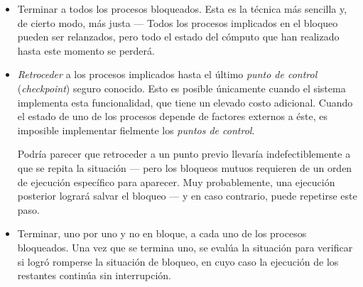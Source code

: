 \documentclass[11pt,fleqn]{book} %
\begin{document}
\begin{itemize}
\item Terminar a todos los procesos bloqueados. Esta es la técnica más
  sencilla y, de cierto modo, más justa — Todos los procesos
  implicados en el bloqueo pueden ser relanzados, pero todo el estado
  del cómputo que han realizado hasta este momento se perderá.
\item \emph{Retroceder} a los procesos implicados hasta el último \emph{punto de   control} (\emph{checkpoint}) seguro conocido. Esto es posible únicamente cuando
  el sistema implementa esta funcionalidad, que tiene un elevado costo
  adicional. Cuando el estado de uno de los procesos depende de
  factores externos a éste, es imposible implementar fielmente los
  \emph{puntos de control}.

  Podría parecer que retroceder a un punto previo llevaría
  indefectiblemente a que se repita la situación — pero los bloqueos
  mutuos requieren de un orden de ejecución específico para
  aparecer. Muy probablemente, una ejecución posterior logrará
  salvar el bloqueo — y en caso contrario, puede repetirse este paso.
\item Terminar, uno por uno y no en bloque, a cada uno de los procesos
  bloqueados. Una vez que se termina uno, se evalúa la situación para
  verificar si logró romperse la situación de bloqueo, en cuyo caso la
  ejecución de los restantes continúa sin interrupción.


\end{itemize}
\end{document}
